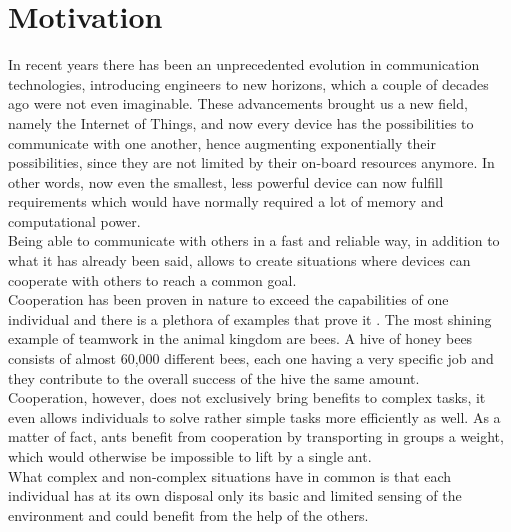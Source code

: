 \documentclass[conference]{IEEEtran}
\begin{document}
\section{Motivation}
In recent years there has been an unprecedented evolution in communication technologies, introducing engineers to new horizons, which a couple of decades ago were not even imaginable. These advancements brought us a new field, namely the Internet of Things, and now every device has the possibilities to communicate with one another, hence augmenting exponentially their possibilities, since they are not limited by their on-board resources anymore. In other words, now even the smallest, less powerful device can now fulfill requirements which would have normally required a lot of memory and computational power. \\
Being able to communicate with others in a fast and reliable way, in addition to what it has already been said, allows to create situations where devices can cooperate with others to reach a common goal.\\ Cooperation has been proven in nature to exceed the capabilities of one individual and there is a plethora of examples that prove it \cite{guided}. The most shining example of teamwork in the animal kingdom are bees. A hive of honey bees consists of almost 60,000 different bees, each one having a very specific job and they contribute to the overall success of the hive the same amount\cite{MAAREC}. \\
Cooperation, however, does not exclusively bring benefits to complex tasks, it even allows individuals to solve rather simple tasks more efficiently as well. As a matter of fact, ants benefit from cooperation by transporting in groups a weight, which would otherwise be impossible to lift by a single ant. \\
What complex and non-complex situations have in common is that each individual has at its own disposal only its basic and limited sensing of the environment and could benefit from the help of the others. \cite{guided} \\
\end{document}
